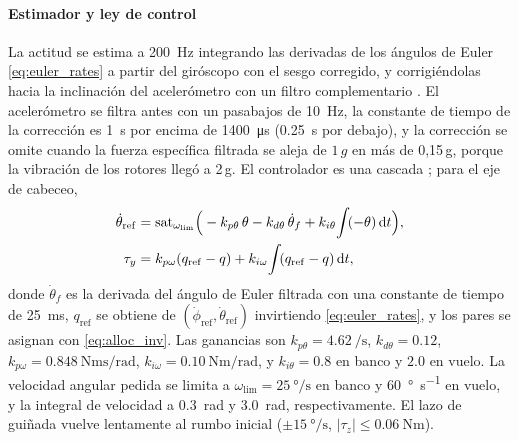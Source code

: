\paragraph{Estimador y ley de control}
La actitud se estima a \SI{200}{\hertz} integrando las derivadas de los ángulos de Euler \eqref{eq:euler_rates} a partir del giróscopo con el sesgo corregido, y corrigiéndolas hacia la inclinación del acelerómetro con un filtro complementario \cite{mahony2008}. El acelerómetro se filtra antes con un pasabajos de \SI{10}{\hertz}, la constante de tiempo de la corrección es \SI{1}{\second} por encima de \SI{1400}{\micro\second} (\SI{0.25}{\second} por debajo), y la corrección se omite cuando la fuerza específica filtrada se aleja de $1\,g$ en más de 0,15\,g, porque la vibración de los rotores llegó a 2\,g. El controlador es una cascada \cite{mahony2012,pounds2010}; para el eje de cabeceo,
\begin{align}
  \dot\theta_{\mathrm{ref}}&=\operatorname{sat}_{\omega_{\lim}}\!\Big(-k_{p\theta}\,\theta-k_{d\theta}\,\dot\theta_f+k_{i\theta}\!\int\!(-\theta)\,\mathrm{d} t\Big), \notag\\
  \tau_y&=k_{p\omega}(q_{\mathrm{ref}}-q)+k_{i\omega}\!\int\!(q_{\mathrm{ref}}-q)\,\mathrm{d} t, \label{eq:cascade}
\end{align}
donde $\dot\theta_f$ es la derivada del ángulo de Euler filtrada con una constante de tiempo de \SI{25}{\milli\second}, $q_{\mathrm{ref}}$ se obtiene de $(\dot\phi_{\mathrm{ref}},\dot\theta_{\mathrm{ref}})$ invirtiendo \eqref{eq:euler_rates}, y los pares se asignan con \eqref{eq:alloc_inv}. Las ganancias son $k_{p\theta}=\SI{4.62}{\per\second}$, $k_{d\theta}=0.12$, $k_{p\omega}=\SI{0.848}{\newton\metre\second\per\radian}$, $k_{i\omega}=\SI{0.10}{\newton\metre\per\radian}$, y $k_{i\theta}=0.8$ en banco y $2.0$ en vuelo. La velocidad angular pedida se limita a $\omega_{\lim}=\SI{25}{\degree\per\second}$ en banco y \SI{60}{\degree\per\second} en vuelo, y la integral de velocidad a \SI{0.3}{\radian} y \SI{3.0}{\radian}, respectivamente. El lazo de guiñada vuelve lentamente al rumbo inicial ($\pm\SI{15}{\degree\per\second}$, $|\tau_z|\le\SI{0.06}{\newton\metre}$).

